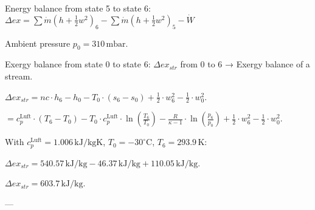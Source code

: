 Energy balance from state 5 to state 6:  
\( \Delta ex = \sum \dot{m} \left( h + \frac{1}{2} w^2 \right)_{6} - \sum \dot{m} \left( h + \frac{1}{2} w^2 \right)_{5} - \dot{W} \)

Ambient pressure \( p_0 = 310 \, \text{mbar} \).  

Exergy balance from state 0 to state 6:  
\( \Delta ex_{str} \) from 0 to 6 → Exergy balance of a stream.  

\( \Delta ex_{str} = nc \cdot h_6 - h_0 - T_0 \cdot (s_6 - s_0) + \frac{1}{2} \cdot w_6^2 - \frac{1}{2} \cdot w_0^2 \).  

\( = c_p^{\text{Luft}} \cdot (T_6 - T_0) - T_0 \cdot c_p^{\text{Luft}} \cdot \ln \left( \frac{T_6}{T_0} \right) - \frac{R}{\kappa - 1} \cdot \ln \left( \frac{p_6}{p_0} \right) + \frac{1}{2} \cdot w_6^2 - \frac{1}{2} \cdot w_0^2 \).  

With \( c_p^{\text{Luft}} = 1.006 \, \text{kJ/kgK} \), \( T_0 = -30^\circ \text{C} \), \( T_6 = 293.9 \, \text{K} \):  

\( \Delta ex_{str} = 540.57 \, \text{kJ/kg} - 46.37 \, \text{kJ/kg} + 110.05 \, \text{kJ/kg} \).  

\( \Delta ex_{str} = 603.7 \, \text{kJ/kg} \).  

---